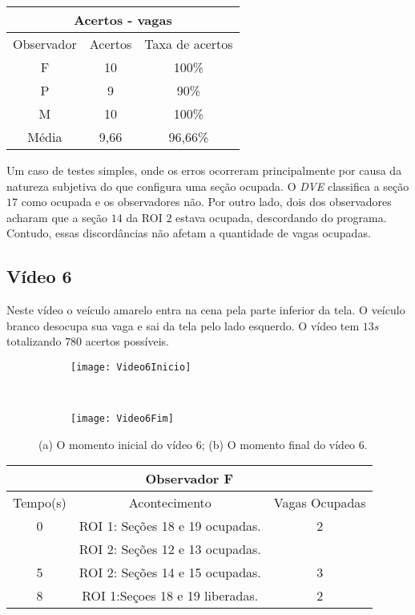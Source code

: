 \begin{center}
\begin{tabular}{|c||c||c|}
\hline
\multicolumn{3}{|c|}{Acertos - vagas}  \\ \hline \hline
Observador & Acertos & Taxa de acertos \\ \hline
F & 10 & 100\% \\  \hline
P & 9 & 90\% \\ \hline
M & 10 & 100\% \\ \hline
Média & 9,66 & 96,66\% \\
\hline
\end{tabular}
\end{center}


Um caso de testes simples, onde os erros ocorreram principalmente por causa da natureza subjetiva do que configura uma seção ocupada. O \textit{DVE} classifica a seção $17$ como ocupada e os observadores não. Por outro lado, dois dos observadores acharam que a seção $14$ da ROI $2$ estava ocupada, descordando do programa. Contudo, essas discordâncias não afetam a quantidade de vagas ocupadas.

\subsection{Vídeo 6}

Neste vídeo o veículo amarelo entra na cena pela parte inferior da tela. O veículo branco desocupa sua vaga e sai da tela pelo lado esquerdo. O vídeo tem $13s$ totalizando $780$ acertos possíveis.

\begin{figure}[!h]
\centering
\begin{subfigure}{.5\textwidth}
\centering
\texttt{[image: Video6Inicio]}
\caption{}
\end{subfigure}\
\begin{subfigure}{.5\textwidth}
\centering
\texttt{[image: Video6Fim]}
\caption{}
\end{subfigure}
\centering
\caption{(a) O momento inicial do vídeo 6; (b) O momento final do vídeo 6.}%
\label{}%
\end{figure}

\begin{center}
\begin{tabular}{|c||c||c|}
\hline
\multicolumn{3}{|c|}{Observador F}  \\ \hline \hline
Tempo(s) & Acontecimento & Vagas Ocupadas \\ \hline
0 & ROI 1: Seções 18 e 19 ocupadas. & 2 \\
 & ROI 2: Seções 12 e 13 ocupadas. &  \\ \hline
5 & ROI 2: Seções 14 e 15 ocupadas. & 3 \\ \hline
8 & ROI 1:Seçoes 18 e 19 liberadas. & 2 \\
\hline
\end{tabular}
\end{center}

